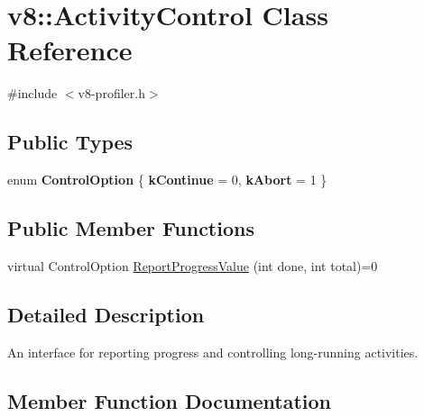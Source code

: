 \hypertarget{classv8_1_1ActivityControl}{}\section{v8\+:\+:Activity\+Control Class Reference}
\label{classv8_1_1ActivityControl}


{\ttfamily \#include $<$v8-\/profiler.\+h$>$}

\subsection*{Public Types}
\begin{DoxyCompactItemize}
\item 
enum {\bfseries Control\+Option} \{ {\bfseries k\+Continue} = 0, 
{\bfseries k\+Abort} = 1
 \}\hypertarget{classv8_1_1ActivityControl_a6d261e8c21e8076ce86b4add231a8ef9}{}\label{classv8_1_1ActivityControl_a6d261e8c21e8076ce86b4add231a8ef9}

\end{DoxyCompactItemize}
\subsection*{Public Member Functions}
\begin{DoxyCompactItemize}
\item 
virtual Control\+Option \hyperlink{classv8_1_1ActivityControl_a1300f10611306a3e8f79239e057eb0bf}{Report\+Progress\+Value} (int done, int total)=0
\end{DoxyCompactItemize}


\subsection{Detailed Description}
An interface for reporting progress and controlling long-\/running activities. 

\subsection{Member Function Documentation}
